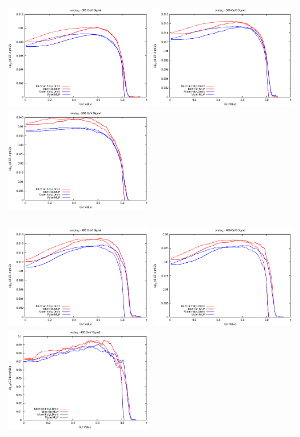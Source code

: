 \begin{figure}[htb!]
\begin{center}
\centerline{
  \includegraphics[width=0.33\textwidth]{Optimization/5ang/zero_300.eps}
 \includegraphics[width=0.33\textwidth]{Optimization/5ang/one_300.eps}
\includegraphics[width=0.33\textwidth]{Optimization/5ang/two_300.eps}
}
\centerline{
  \includegraphics[width=0.33\textwidth]{Optimization/5ang/zero_400.eps}
\includegraphics[width=0.33\textwidth]{Optimization/5ang/one_400.eps} 
\includegraphics[width=0.33\textwidth]{Optimization/5ang/two_400.eps}
}
\end{center}
\end{figure}
